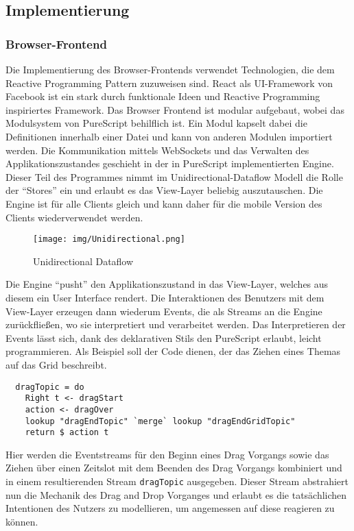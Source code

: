 \subsection{Implementierung}
\subsubsection{Browser-Frontend}
Die Implementierung des Browser-Frontends verwendet Technologien, die
dem \gls{Reactive Programming} Pattern zuzuweisen sind. \gls{React} als
UI-Framework von Facebook ist ein stark durch funktionale Ideen und
\gls{Reactive Programming} inspiriertes Framework. Das Browser
Frontend ist modular aufgebaut, wobei das Modulsystem von
\gls{PureScript} behilflich ist. Ein Modul kapselt dabei die Definitionen innerhalb
einer Datei und kann von anderen Modulen importiert werden. Die
Kommunikation mittels WebSockets und das Verwalten des
Applikationszustandes geschieht in der in \gls{PureScript} implementierten
Engine. Dieser Teil des Programmes nimmt im Unidirectional-Dataflow
Modell die Rolle der ``Stores'' ein und erlaubt es das View-Layer
beliebig auszutauschen. Die Engine ist für alle Clients gleich und
kann daher für die mobile Version des Clients wiederverwendet werden.
\begin{figure}[h]
\texttt{[image: img/Unidirectional.png]}
\caption{Unidirectional Dataflow}
\end{figure}

\noindent Die Engine ``pusht'' den Applikationszustand in das
View-Layer, welches aus diesem ein User Interface rendert.
Die Interaktionen des Benutzers mit dem View-Layer erzeugen dann
wiederum Events, die als Streams an die Engine zurückfließen, wo sie
interpretiert und verarbeitet werden. Das Interpretieren der Events
lässt sich, dank des deklarativen Stils den PureScript erlaubt, leicht
programmieren. Als Beispiel soll der Code dienen, der das Ziehen eines
Themas auf das Grid beschreibt.

\begin{lstlisting}
  dragTopic = do
    Right t <- dragStart
    action <- dragOver
    lookup "dragEndTopic" `merge` lookup "dragEndGridTopic"
    return $ action t
\end{lstlisting}
\noindent Hier werden die Eventstreams für den Beginn eines
Drag Vorgangs sowie das Ziehen über einen Zeitslot mit dem Beenden des
Drag Vorgangs kombiniert und in einem resultierenden Stream \texttt{dragTopic}
ausgegeben. Dieser Stream abstrahiert nun die Mechanik des Drag and
Drop Vorganges und erlaubt es die tatsächlichen Intentionen des
Nutzers zu modellieren, um angemessen auf diese reagieren zu können.
